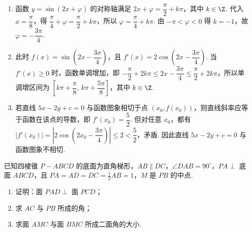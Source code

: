 \begin{solution}
\begin{enumerate}
\item 函数 \(y=\sin(2x+\varphi)\) 的对称轴满足 \(2x+\varphi=\dfrac{\pi}{2}+k\pi\)，其中 \(k\in\Z\). 代入 \(x=\dfrac{\pi}{8}\)，得 \(\dfrac{\pi}{4}+\varphi=\dfrac{\pi}{2}+k\pi\)，所以 \(\varphi=\dfrac{\pi}{4}+k\pi\). 由 \(-\pi<\varphi<0\) 得 \(k=-1\)，故 \(\varphi=-\dfrac{3\pi}{4}\).
\item 此时 \(f(x)=\sin\left(2x-\dfrac{3\pi}{4}\right)\)，且 \(f'(x)=2\cos\left(2x-\dfrac{3\pi}{4}\right)\). 当 \(f'(x)\geqslant0\) 时，函数单调增加，即 \(-\dfrac{\pi}{2}+2k\pi\leqslant2x-\dfrac{3\pi}{4}\leqslant\dfrac{\pi}{2}+2k\pi\)，所以单调增区间为 \(\left[k\pi+\dfrac{\pi}{8},\,k\pi+\dfrac{5\pi}{8}\right]\)，其中 \(k\in\Z\).
\item 若直线 \(5x-2y+c=0\) 与函数图象相切于点 \((x_0,f(x_0))\)，则直线斜率应等于函数在该点的导数，即 \(f'(x_0)=\dfrac{5}{2}\). 但对任意 \(x_0\)，都有 \(\left|f'(x_0)\right|=\left|2\cos\left(2x_0-\dfrac{3\pi}{4}\right)\right|\leqslant2<\dfrac{5}{2}\)，矛盾. 因此直线 \(5x-2y+c=0\) 与函数图象不相切.
\end{enumerate}
\end{solution}

\begin{problem}
已知四棱锥 \(P - ABCD\) 的底面为直角梯形，\(AB \parallel DC\)，\(\angle DAB = 90^{\circ}\)，\(PA \perp\) 底面 \(ABCD\)，且 \(PA = AD = DC = \frac{1}{2} AB = 1\)，\(M\) 是 \(PB\) 的中点.

\begin{enumerate}
\item 证明：面 \(PAD \perp\) 面 \(PCD\)；
\item 求 \(AC\) 与 \(PB\) 所成的角；
\item 求面 \(AMC\) 与面 \(BMC\) 所成二面角的大小.
\end{enumerate}


\end{problem}

